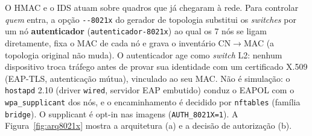 \documentclass[12pt]{article}
\newcommand{\dd}{-{}-}
\begin{document}
O HMAC e o IDS atuam sobre quadros que j\'a chegaram \`a rede. Para controlar \emph{quem} entra, a op\c{c}\~ao \texttt{\dd{}8021x} do gerador de topologia substitui os \emph{switches} por um n\'o \textbf{autenticador} (\texttt{autenticador-8021x}) ao qual os 7 n\'os se ligam diretamente, fixa o MAC de cada n\'o e grava o invent\'ario CN$\rightarrow$MAC (a topologia original n\~ao muda). O autenticador age como \emph{switch} L2: nenhum dispositivo troca tr\'afego antes de provar sua identidade com um certificado X.509 (EAP-TLS, autentica\c{c}\~ao m\'utua), vinculado ao seu MAC. N\~ao \'e simula\c{c}\~ao: o \texttt{hostapd} 2.10 (driver \texttt{wired}, servidor EAP embutido) conduz o EAPOL com o \texttt{wpa\_supplicant} dos n\'os, e o encaminhamento \'e decidido por \texttt{nftables} (fam\'ilia \texttt{bridge}). O supplicant \'e opt-in nas imagens (\texttt{AUTH\_8021X=1}). A Figura~\ref{fig:arq8021x} mostra a arquitetura (a) e a decis\~ao de autoriza\c{c}\~ao (b).
\end{document}
